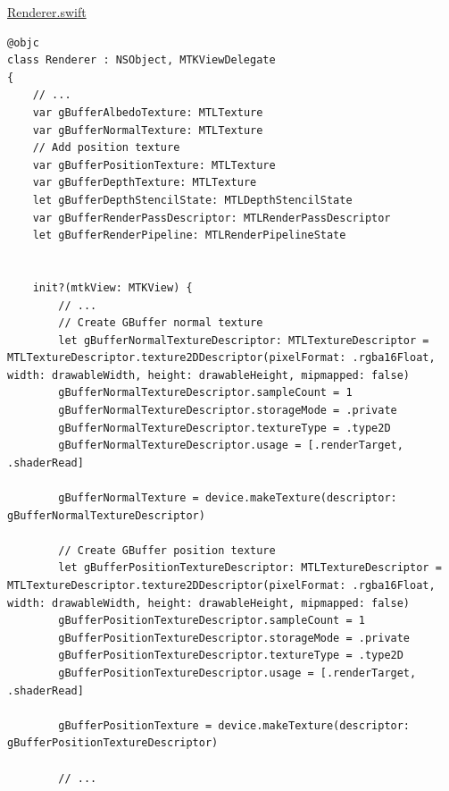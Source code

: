 \documentclass[11pt]{article}
\begin{document}
\uline{Renderer.swift}
\begin{verbatim}
@objc
class Renderer : NSObject, MTKViewDelegate
{
    // ...
    var gBufferAlbedoTexture: MTLTexture
    var gBufferNormalTexture: MTLTexture
    // Add position texture
    var gBufferPositionTexture: MTLTexture
    var gBufferDepthTexture: MTLTexture
    let gBufferDepthStencilState: MTLDepthStencilState
    var gBufferRenderPassDescriptor: MTLRenderPassDescriptor
    let gBufferRenderPipeline: MTLRenderPipelineState


    init?(mtkView: MTKView) {
        // ...
        // Create GBuffer normal texture
        let gBufferNormalTextureDescriptor: MTLTextureDescriptor = MTLTextureDescriptor.texture2DDescriptor(pixelFormat: .rgba16Float, width: drawableWidth, height: drawableHeight, mipmapped: false)
        gBufferNormalTextureDescriptor.sampleCount = 1
        gBufferNormalTextureDescriptor.storageMode = .private
        gBufferNormalTextureDescriptor.textureType = .type2D
        gBufferNormalTextureDescriptor.usage = [.renderTarget, .shaderRead]

        gBufferNormalTexture = device.makeTexture(descriptor: gBufferNormalTextureDescriptor)

        // Create GBuffer position texture
        let gBufferPositionTextureDescriptor: MTLTextureDescriptor = MTLTextureDescriptor.texture2DDescriptor(pixelFormat: .rgba16Float, width: drawableWidth, height: drawableHeight, mipmapped: false)
        gBufferPositionTextureDescriptor.sampleCount = 1
        gBufferPositionTextureDescriptor.storageMode = .private
        gBufferPositionTextureDescriptor.textureType = .type2D
        gBufferPositionTextureDescriptor.usage = [.renderTarget, .shaderRead]

        gBufferPositionTexture = device.makeTexture(descriptor: gBufferPositionTextureDescriptor)

        // ...


\end{verbatim}
\end{document}
